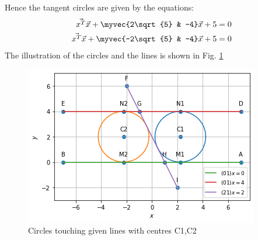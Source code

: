 Hence the tangent circles are given by the equations:
\begin{align}
\vec{x^T}\vec{x} + \myvec{2\sqrt{5} & -4}\vec{x} + 5 &= 0 \\
\vec{x^T}\vec{x} + \myvec{-2\sqrt{5} & -4}\vec{x} + 5 &= 0
\end{align}
The illustration of the circles and the lines is shown in Fig.     \ref{rams/4/2/16/Tangent circles to 3 given lines}
\begin{figure}[!ht]
       \centering
    \includegraphics[width=\columnwidth] {solutions/4/2/16/Assignment_3_Fig_1.png}
    \caption{Circles touching given lines with centres C1,C2}
    \label{rams/4/2/16/Tangent circles to 3 given lines}
\end{figure}


